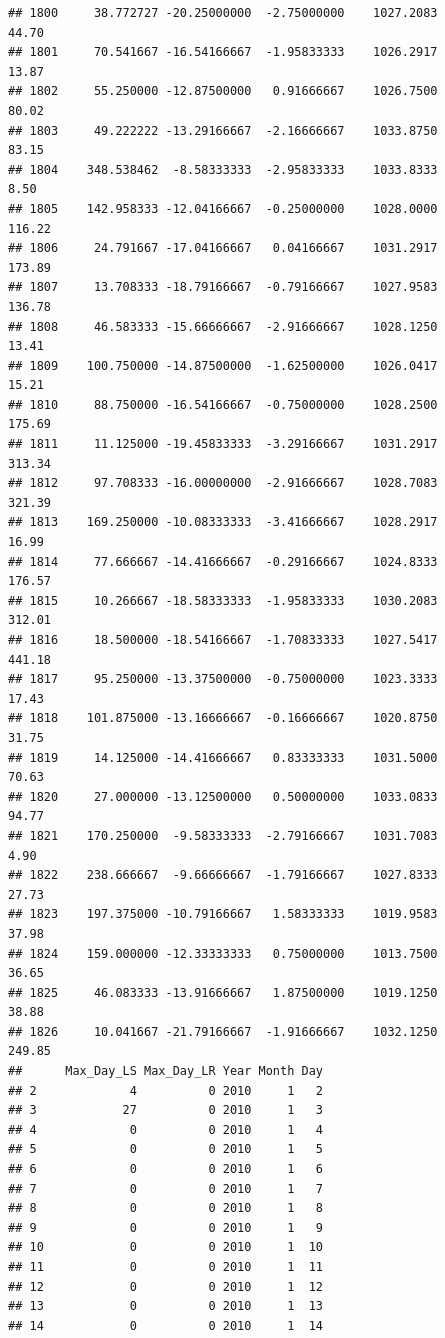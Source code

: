 \documentclass[
]{article}
\begin{document}
\begin{verbatim}
## 1800     38.772727 -20.25000000  -2.75000000    1027.2083       44.70
## 1801     70.541667 -16.54166667  -1.95833333    1026.2917       13.87
## 1802     55.250000 -12.87500000   0.91666667    1026.7500       80.02
## 1803     49.222222 -13.29166667  -2.16666667    1033.8750       83.15
## 1804    348.538462  -8.58333333  -2.95833333    1033.8333        8.50
## 1805    142.958333 -12.04166667  -0.25000000    1028.0000      116.22
## 1806     24.791667 -17.04166667   0.04166667    1031.2917      173.89
## 1807     13.708333 -18.79166667  -0.79166667    1027.9583      136.78
## 1808     46.583333 -15.66666667  -2.91666667    1028.1250       13.41
## 1809    100.750000 -14.87500000  -1.62500000    1026.0417       15.21
## 1810     88.750000 -16.54166667  -0.75000000    1028.2500      175.69
## 1811     11.125000 -19.45833333  -3.29166667    1031.2917      313.34
## 1812     97.708333 -16.00000000  -2.91666667    1028.7083      321.39
## 1813    169.250000 -10.08333333  -3.41666667    1028.2917       16.99
## 1814     77.666667 -14.41666667  -0.29166667    1024.8333      176.57
## 1815     10.266667 -18.58333333  -1.95833333    1030.2083      312.01
## 1816     18.500000 -18.54166667  -1.70833333    1027.5417      441.18
## 1817     95.250000 -13.37500000  -0.75000000    1023.3333       17.43
## 1818    101.875000 -13.16666667  -0.16666667    1020.8750       31.75
## 1819     14.125000 -14.41666667   0.83333333    1031.5000       70.63
## 1820     27.000000 -13.12500000   0.50000000    1033.0833       94.77
## 1821    170.250000  -9.58333333  -2.79166667    1031.7083        4.90
## 1822    238.666667  -9.66666667  -1.79166667    1027.8333       27.73
## 1823    197.375000 -10.79166667   1.58333333    1019.9583       37.98
## 1824    159.000000 -12.33333333   0.75000000    1013.7500       36.65
## 1825     46.083333 -13.91666667   1.87500000    1019.1250       38.88
## 1826     10.041667 -21.79166667  -1.91666667    1032.1250      249.85
##      Max_Day_LS Max_Day_LR Year Month Day
## 2             4          0 2010     1   2
## 3            27          0 2010     1   3
## 4             0          0 2010     1   4
## 5             0          0 2010     1   5
## 6             0          0 2010     1   6
## 7             0          0 2010     1   7
## 8             0          0 2010     1   8
## 9             0          0 2010     1   9
## 10            0          0 2010     1  10
## 11            0          0 2010     1  11
## 12            0          0 2010     1  12
## 13            0          0 2010     1  13
## 14            0          0 2010     1  14

\end{verbatim}
\end{document}
